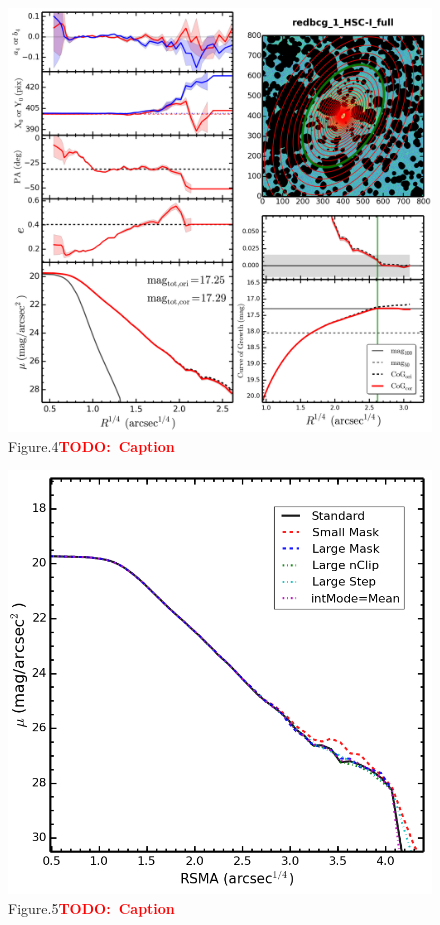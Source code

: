 \documentclass[preprint]{aastex}
\newcommand{\todo}[1]{\textcolor{red}{\textbf{TODO:~#1}}}
\begin{document}
\begin{CJK*}{UTF8}{gbsn}
\clearpage
{}
\begin{figure}
    \centering 
    \includegraphics[width=15.5cm]{fig/redbcg_1_HSC-I_full_imgsub_ellip_default_sum.png}
    \caption{Figure.4\todo{Caption}}
    \label{figure:4}
\end{figure}

\clearpage
{}
\begin{figure}
    \centering 
    \includegraphics[width=14.0cm]{fig/redbcg_1_HSC-I_full_imgsub_ellip_default_compare.png}
    \caption{Figure.5\todo{Caption}}
    \label{figure:5}
\end{figure}


\end{CJK*}

\clearpage 

%

\label{lastpage}
\end{document}
